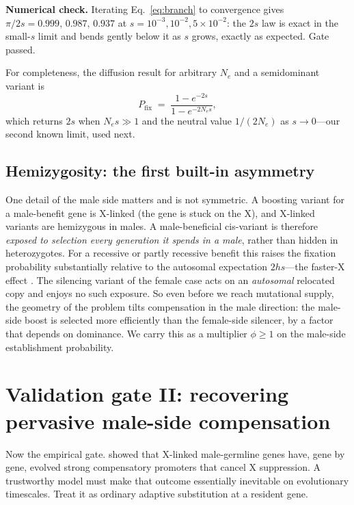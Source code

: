 \documentclass[11pt,a4paper]{article}
\newcommand{\Ne}{N_{e}}
\newcommand{\Pfix}{P_{\mathrm{fix}}}
\begin{document}
\begin{checkpoint}
\textbf{Numerical check.} Iterating Eq.~\eqref{eq:branch} to convergence gives $\pi/2s = 0.999,\,0.987,\,0.937$ at $s=10^{-3},10^{-2},5\times10^{-2}$: the $2s$ law is exact in the small-$s$ limit and bends gently below it as $s$ grows, exactly as expected. Gate passed.
\end{checkpoint}

For completeness, the diffusion result for arbitrary $\Ne$ and a semidominant variant is
\begin{equation}
\Pfix \;=\; \frac{1-e^{-2s}}{1-e^{-2\Ne s}},
\label{eq:diffusion}
\end{equation}
which returns $2s$ when $\Ne s\gg1$ and the neutral value $1/(2\Ne)$ as $s\to0$---our second known limit, used next.

\subsection{Hemizygosity: the first built-in asymmetry}

One detail of the male side matters and is not symmetric. A boosting variant for a male-benefit gene is X-linked (the gene is stuck on the X), and X-linked variants are hemizygous in males. A male-beneficial cis-variant is therefore \emph{exposed to selection every generation it spends in a male}, rather than hidden in heterozygotes. For a recessive or partly recessive benefit this raises the fixation probability substantially relative to the autosomal expectation $2hs$---the faster-X effect \citep{ccb1987,vicoso2006}. The silencing variant of the female case acts on an \emph{autosomal} relocated copy and enjoys no such exposure. So even before we reach mutational supply, the geometry of the problem tilts compensation in the male direction: the male-side boost is selected more efficiently than the female-side silencer, by a factor that depends on dominance. We carry this as a multiplier $\phi\ge1$ on the male-side establishment probability.

\section{Validation gate II: recovering pervasive male-side compensation}

Now the empirical gate. \cite{landeen2016} showed that X-linked male-germline genes have, gene by gene, evolved strong compensatory promoters that cancel X suppression. A trustworthy model must make that outcome essentially inevitable on evolutionary timescales. Treat it as ordinary adaptive substitution at a resident gene.
\end{document}
